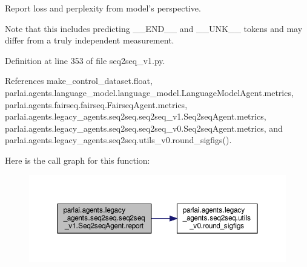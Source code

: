 \begin{DoxyVerb}Report loss and perplexity from model's perspective.

Note that this includes predicting __END__ and __UNK__ tokens and may
differ from a truly independent measurement.
\end{DoxyVerb}
 

Definition at line 353 of file seq2seq\+\_\+v1.\+py.



References make\+\_\+control\+\_\+dataset.\+float, parlai.\+agents.\+language\+\_\+model.\+language\+\_\+model.\+Language\+Model\+Agent.\+metrics, parlai.\+agents.\+fairseq.\+fairseq.\+Fairseq\+Agent.\+metrics, parlai.\+agents.\+legacy\+\_\+agents.\+seq2seq.\+seq2seq\+\_\+v1.\+Seq2seq\+Agent.\+metrics, parlai.\+agents.\+legacy\+\_\+agents.\+seq2seq.\+seq2seq\+\_\+v0.\+Seq2seq\+Agent.\+metrics, and parlai.\+agents.\+legacy\+\_\+agents.\+seq2seq.\+utils\+\_\+v0.\+round\+\_\+sigfigs().

Here is the call graph for this function\+:
\nopagebreak
\begin{figure}[H]
\begin{center}
\leavevmode
\includegraphics[width=350pt]{classparlai_1_1agents_1_1legacy__agents_1_1seq2seq_1_1seq2seq__v1_1_1Seq2seqAgent_ae588ce85bae56791bac9dd744e5414ce_cgraph}
\end{center}
\end{figure}
\mbox{\label{classparlai_1_1agents_1_1legacy__agents_1_1seq2seq_1_1seq2seq__v1_1_1Seq2seqAgent_a521db011d2188e8e513976af5737c322}} 
